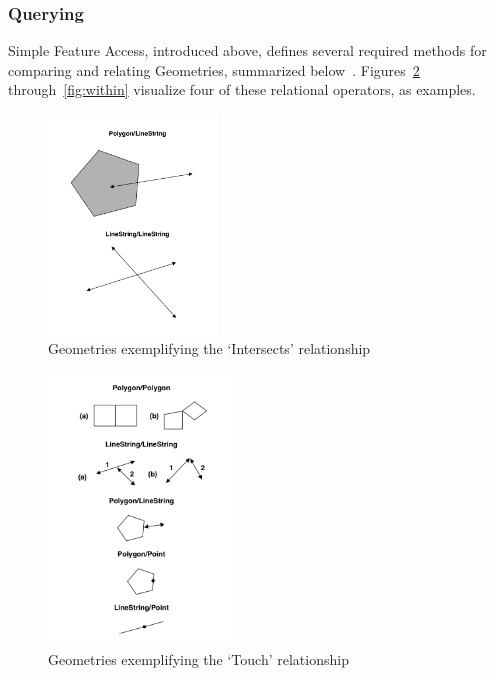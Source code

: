 \subsubsection{Querying}
Simple Feature Access, introduced above, defines several required methods for comparing and relating Geometries, summarized below~\cite{SFA}. Figures~\ref{fig:touches} through~\ref{fig:within} visualize four of these relational operators, as examples.



\begin{figure}
    \centering

    \includegraphics[width=0.4\textwidth]{figures/crosses.png}
    
    \caption{Geometries exemplifying the `Intersects' relationship}
    \label{fig:intersects}
    
\end{figure}

\begin{figure}
    \centering

    \includegraphics[width=0.45\textwidth]{figures/touches.png}
    
    \caption{Geometries exemplifying the `Touch' relationship}
    \label{fig:touches}
    
\end{figure}

